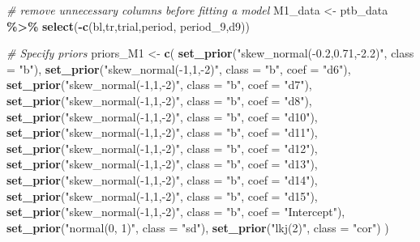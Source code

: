 \documentclass[
  man,floatsintext]{apa6}
\newenvironment{Shaded}{\begin{snugshade}}{\end{snugshade}}
\newcommand{\AttributeTok}[1]{\textcolor[rgb]{0.13,0.29,0.53}{#1}}
\newcommand{\CommentTok}[1]{\textcolor[rgb]{0.56,0.35,0.01}{\textit{#1}}}
\newcommand{\FunctionTok}[1]{\textcolor[rgb]{0.13,0.29,0.53}{\textbf{#1}}}
\newcommand{\NormalTok}[1]{#1}
\newcommand{\OtherTok}[1]{\textcolor[rgb]{0.56,0.35,0.01}{#1}}
\newcommand{\SpecialCharTok}[1]{\textcolor[rgb]{0.81,0.36,0.00}{\textbf{#1}}}
\newcommand{\StringTok}[1]{\textcolor[rgb]{0.31,0.60,0.02}{#1}}
\begin{document}
\begin{Shaded}
\begin{Highlighting}[]
\CommentTok{\# remove unnecessary columns before fitting a model}
\NormalTok{M1\_data }\OtherTok{\textless{}{-}}\NormalTok{ ptb\_data }\SpecialCharTok{\%\textgreater{}\%} \FunctionTok{select}\NormalTok{(}\SpecialCharTok{{-}}\FunctionTok{c}\NormalTok{(bl,tr,trial,period, period\_9,d9))  }

\CommentTok{\# Specify priors}
\NormalTok{priors\_M1 }\OtherTok{\textless{}{-}} \FunctionTok{c}\NormalTok{(}
  \FunctionTok{set\_prior}\NormalTok{(}\StringTok{"skew\_normal({-}0.2,0.71,{-}2.2)"}\NormalTok{, }\AttributeTok{class =} \StringTok{"b"}\NormalTok{),       }
  \FunctionTok{set\_prior}\NormalTok{(}\StringTok{"skew\_normal({-}1,1,{-}2)"}\NormalTok{, }\AttributeTok{class =} \StringTok{"b"}\NormalTok{, }\AttributeTok{coef =} \StringTok{"d6"}\NormalTok{),}
  \FunctionTok{set\_prior}\NormalTok{(}\StringTok{"skew\_normal({-}1,1,{-}2)"}\NormalTok{, }\AttributeTok{class =} \StringTok{"b"}\NormalTok{, }\AttributeTok{coef =} \StringTok{"d7"}\NormalTok{), }
  \FunctionTok{set\_prior}\NormalTok{(}\StringTok{"skew\_normal({-}1,1,{-}2)"}\NormalTok{, }\AttributeTok{class =} \StringTok{"b"}\NormalTok{, }\AttributeTok{coef =} \StringTok{"d8"}\NormalTok{), }
  \FunctionTok{set\_prior}\NormalTok{(}\StringTok{"skew\_normal({-}1,1,{-}2)"}\NormalTok{, }\AttributeTok{class =} \StringTok{"b"}\NormalTok{, }\AttributeTok{coef =} \StringTok{"d10"}\NormalTok{), }
  \FunctionTok{set\_prior}\NormalTok{(}\StringTok{"skew\_normal({-}1,1,{-}2)"}\NormalTok{, }\AttributeTok{class =} \StringTok{"b"}\NormalTok{, }\AttributeTok{coef =} \StringTok{"d11"}\NormalTok{), }
  \FunctionTok{set\_prior}\NormalTok{(}\StringTok{"skew\_normal({-}1,1,{-}2)"}\NormalTok{, }\AttributeTok{class =} \StringTok{"b"}\NormalTok{, }\AttributeTok{coef =} \StringTok{"d12"}\NormalTok{), }
  \FunctionTok{set\_prior}\NormalTok{(}\StringTok{"skew\_normal({-}1,1,{-}2)"}\NormalTok{, }\AttributeTok{class =} \StringTok{"b"}\NormalTok{, }\AttributeTok{coef =} \StringTok{"d13"}\NormalTok{), }
  \FunctionTok{set\_prior}\NormalTok{(}\StringTok{"skew\_normal({-}1,1,{-}2)"}\NormalTok{, }\AttributeTok{class =} \StringTok{"b"}\NormalTok{, }\AttributeTok{coef =} \StringTok{"d14"}\NormalTok{), }
  \FunctionTok{set\_prior}\NormalTok{(}\StringTok{"skew\_normal({-}1,1,{-}2)"}\NormalTok{, }\AttributeTok{class =} \StringTok{"b"}\NormalTok{, }\AttributeTok{coef =} \StringTok{"d15"}\NormalTok{),}
  \FunctionTok{set\_prior}\NormalTok{(}\StringTok{"skew\_normal({-}1,1,{-}2)"}\NormalTok{, }\AttributeTok{class =} \StringTok{"b"}\NormalTok{, }\AttributeTok{coef =} \StringTok{"Intercept"}\NormalTok{),}
  \FunctionTok{set\_prior}\NormalTok{(}\StringTok{"normal(0, 1)"}\NormalTok{, }\AttributeTok{class =} \StringTok{"sd"}\NormalTok{),        }
  \FunctionTok{set\_prior}\NormalTok{(}\StringTok{"lkj(2)"}\NormalTok{, }\AttributeTok{class =} \StringTok{"cor"}\NormalTok{)            }
\NormalTok{)}
\end{Highlighting}
\end{Shaded}
\end{document}
